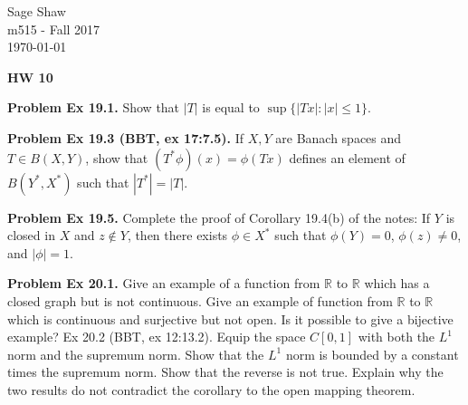 \documentclass[12pt]{article}
\newcommand{\problem}[1]{\hspace{-4 ex} \large \textbf{Problem #1} }
\newcommand{\RR}{\mathbb{R}}
\begin{document}
	\thispagestyle{empty}
	
	\begin{flushright}
		Sage Shaw \\
		m515 - Fall 2017 \\
		\today
	\end{flushright}
	
{\large \textbf{HW 10}}\bigbreak

\problem{Ex 19.1.} Show that $|T|$ is equal to $\sup\{|Tx|:|x|\leq1\}$.


\bigbreak
\problem{Ex 19.3 (BBT, ex 17:7.5).} If $X,Y$ are Banach spaces and $T\in B(X,Y)$, show that $(T^*\phi)(x)=\phi(Tx)$ defines an element of $B(Y^*,X^*)$ such that $|T^*|=|T|$.

\bigbreak
\problem{Ex 19.5.} Complete the proof of Corollary 19.4(b) of the notes: If $Y$ is closed in $X$ and $z\notin Y$, then there exists $\phi\in X^*$ such that $\phi(Y)=0$, $\phi(z)\neq0$, and $|\phi|=1$.

\bigbreak
\problem{Ex 20.1.} Give an example of a function from $\RR$ to $\RR$ which has a closed graph but is not continuous. Give an example of function from $\RR$ to $\RR$ which is continuous and surjective but not open. Is it possible to give a bijective example?
Ex 20.2 (BBT, ex 12:13.2). Equip the space $C[0,1]$ with both the $L^1$ norm and the supremum norm. Show that the $L^1$ norm is bounded by a constant times the supremum norm. Show that the reverse is not true. Explain why the two results do not contradict the corollary to the open mapping theorem.
\end{document}
